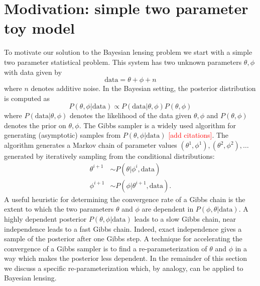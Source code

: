 \documentclass[noinfoline]{imsart}
\begin{document}
%
%
\section{Modivation: simple two parameter toy model}
\label{two parameter system}


To motivate our solution to the Bayesian lensing problem we start with a simple two parameter statistical problem.  This system has two unknown parameters $\theta, \phi$ with data given by
\[\text{data} = \theta + \phi + n\]
where $n$ denotes additive noise.  In the Bayesian setting, the posterior distribution is computed as 
\begin{equation}
\label{post1}
 P(\theta,\phi|\text{data})\propto P(\text{data}|\theta, \phi) P(\theta,\phi) 
 \end{equation}
where $P(\text{data}|\theta, \phi)$ denotes the likelihood of the data given  $\theta, \phi$ and $P(\theta,\phi)$ denotes the  prior on $\theta, \phi$. 
The Gibbs sampler is a widely used algorithm for generating (asymptotic) samples from  $P(\theta, \phi|\text{data})$ \textcolor{red}{[add citations]}. The algorithm generates a Markov chain of parameter values $(\theta^{1}, \phi^{1}), (\theta^{2}, \phi^{2}),\ldots$ generated by iteratively sampling from the conditional distributions:
\begin{align*}
\theta^{i+1} &\sim P(\theta|\phi^i,\text{data})\\
\phi^{i+1}   &\sim P(\phi|\theta^{i+1},\text{data}).
\end{align*}
A useful heuristic for determining the convergence rate of a Gibbs chain is the extent to which the two parameters $\theta$ and $\phi$ are dependent in $P(\phi, \theta|\text{data})$. A highly dependent posterior $P(\theta, \phi|\text{data})$ leads to a slow Gibbs chain, near independence leads to a fast Gibbs chain. Indeed, exact independence gives a sample of the posterior after one Gibbs step.  A technique for accelerating the convergence of a Gibbs sampler is to find a  re-parameterization of $\theta$ and $\phi$ in a way which makes the posterior less dependent. In the remainder of this section we discuss a specific re-parameterization which, by analogy, can be applied to Bayesian lensing.
\end{document}
